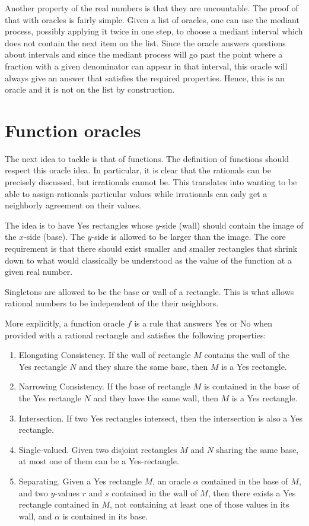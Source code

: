 \documentclass[12pt]{article}
\theoremstyle{remark}
\begin{document}
Another property of the real numbers is that they are uncountable. The proof of that with oracles is fairly simple. Given a list of oracles, one can use the mediant process, possibly applying it twice in one step, to choose a mediant interval which does not contain the next item on the list. Since the oracle answers questions about intervals and since the mediant process will go past the point where a fraction with a given denominator can appear in that interval, this oracle will always give an answer that satisfies the required properties.  Hence, this is an oracle and it is not on the list by construction. 

\section{Function oracles}

The next idea to tackle is that of functions. The definition of functions should respect this oracle idea.  In particular, it is clear that the rationals can be precisely discussed, but irrationals cannot be. This translates into wanting to be able to assign rationals particular values while irrationals can only get a neighborly agreement on their values. 

The idea is to have Yes rectangles whose $y$-side (wall) should contain the image of the $x$-side (base). The $y$-side is allowed to be larger than the image. The core requirement is that there should exist smaller and smaller rectangles that shrink down to what would classically be understood as the value of the function at a given real number. 

Singletons are allowed to be the base or wall of a rectangle. This is what allows rational numbers to be independent of the their neighbors.

More explicitly, a function oracle $f$ is a rule that answers Yes or No when provided with a rational rectangle and satisfies the following properties: 
\begin{enumerate}
    \item Elongating Consistency. If the wall of rectangle $M$ contains the wall of the Yes rectangle $N$ and they share the same base, then $M$ is a Yes rectangle. 
    \item Narrowing Consistency. If the base of rectangle $M$ is contained in the base of the Yes rectangle $N$ and they have the same wall, then $M$ is a Yes rectangle.  
    \item Intersection. If two Yes rectangles intersect, then the intersection is also a Yes rectangle. 
    \item Single-valued. Given two disjoint rectangles $M$ and $N$ sharing the same base, at most one of them can be a Yes-rectangle. 
    \item Separating. Given a Yes rectangle $M$, an oracle $\alpha$ contained in the base of $M$, and two $y$-values $r$ and $s$ contained in the wall of $M$, then there exists a Yes rectangle contained in $M$, not containing at least one of those values in its wall, and $\alpha$ is contained in its base.
\end{enumerate} 
\end{document}
